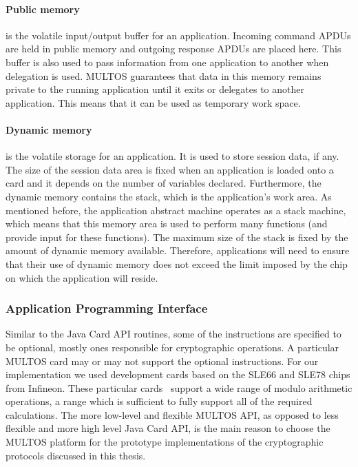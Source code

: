 \paragraph{Public memory} is the volatile input/output buffer for an
application. Incoming command APDUs are held in public memory and outgoing
response APDUs are placed here. This buffer is also used to pass information
from one application to another when delegation is used. MULTOS guarantees that
data in this memory remains private to the running application until it exits
or delegates to another application. This means that it can be used as
temporary work space.

\paragraph{Dynamic memory} is the volatile storage for an application. It is
used to store session data, if any. The size of the session data area is fixed
when an application is loaded onto a card and it depends on the number of
variables declared. Furthermore, the dynamic memory contains the stack, which
is the application's work area. As mentioned before, the application abstract
machine operates as a stack machine, which means that this memory area is used
to perform many functions (and provide input for these functions). The maximum
size of the stack is fixed by the amount of dynamic memory available. Therefore,
applications will need to ensure that their use of dynamic memory does not
exceed the limit imposed by the chip~\cite{MIR2012} on which the application
will reside.

\subsubsection{Application Programming Interface}

Similar to the Java Card API routines, some of the instructions are specified to
be optional, mostly ones responsible for cryptographic operations. A particular
MULTOS card may or may not support the optional instructions. For our
implementation we used development cards based on the SLE66 and SLE78 chips from
Infineon. These particular cards~\cite{MULTOS_Implementation2010} support a wide
range of modulo arithmetic operations, a range which is sufficient to fully
support all of the required calculations. The more low-level and flexible MULTOS
API, as opposed to less flexible and more high level Java Card API, is the main
reason to choose the MULTOS platform for the prototype implementations of the
cryptographic protocols discussed in this thesis.

